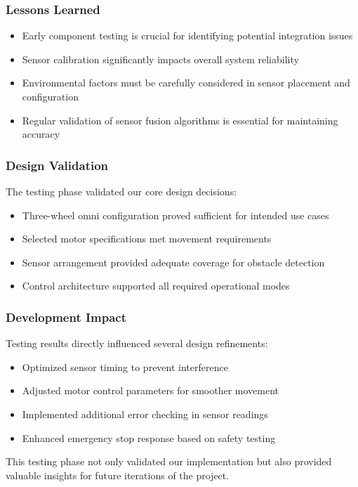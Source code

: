 \documentclass{article}
\begin{document}
\subsubsection{Lessons Learned}
\begin{itemize}
    \item Early component testing is crucial for identifying potential integration issues
    \item Sensor calibration significantly impacts overall system reliability
    \item Environmental factors must be carefully considered in sensor placement and configuration
    \item Regular validation of sensor fusion algorithms is essential for maintaining accuracy
\end{itemize}

\subsubsection{Design Validation}
The testing phase validated our core design decisions:
\begin{itemize}
    \item Three-wheel omni configuration proved sufficient for intended use cases
    \item Selected motor specifications met movement requirements
    \item Sensor arrangement provided adequate coverage for obstacle detection
    \item Control architecture supported all required operational modes
\end{itemize}

\subsubsection{Development Impact}
Testing results directly influenced several design refinements:
\begin{itemize}
    \item Optimized sensor timing to prevent interference
    \item Adjusted motor control parameters for smoother movement
    \item Implemented additional error checking in sensor readings
    \item Enhanced emergency stop response based on safety testing
\end{itemize}

This testing phase not only validated our implementation but also provided valuable insights for future iterations of the project.
\end{document}
